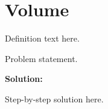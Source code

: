 \section{Volume}


\begin{definition}[Term]
Definition text here.
\end{definition}

\begin{example}
Problem statement.

\textbf{Solution:}

Step-by-step solution here.
\end{example}
